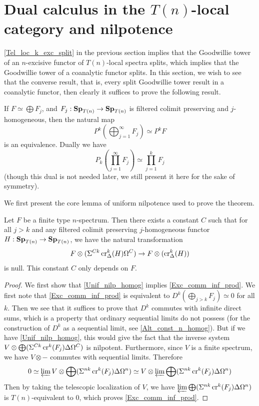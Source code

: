 \section{Dual calculus in the $T(n)$-local category and nilpotence}

	\cref{Tel_loc_k_exc_split} in the previous section implies that the Goodwillie tower of an $n$-excisive functor of $T(n)$-local spectra splits, which implies that the Goodwillie tower of a coanalytic functor splits. In this section, we wish to see that the converse result, that is, every split Goodwillie tower result in a coanalytic functor, then clearly it suffices to prove the following result. 

	\begin{thm}[Mathew]\label{Exc_comm_inf_prod}
		If $F\simeq\bigoplus F_j$, and $F_j:\mathbf{Sp}_{T(n)}\to\mathbf{Sp}_{T(n)}$ is filtered colimit preserving and $j$-homogeneous, then the natural map 
		\[ P^k(\bigoplus_{j=1}^\infty F_j)\simeq P^kF \]
		is an equivalence. 
		Dually we have 
		\[ P_k(\prod_{j=1}^\infty F_j)\simeq\prod_{j=1}^kF_j \]
		(though this dual is not needed later, we still present it here for the sake of symmetry). 
	\end{thm}

	We first present the core lemma of uniform nilpotence used to prove the theorem. 
	\begin{lemma}\label{Unif_nilp_homog}
		Let $F$ be a finite type $n$-spectrum. Then there exists a constant $C$ such that for all $j>k$ and any filtered colimit preserving $j$-homogeneous functor $H:\mathbf{Sp}_{T(n)}\to\mathbf{Sp}_{T(n)}$, we have the natural transformation 
		\[ F\otimes(\Sigma^{Ck}\operatorname{\mathrm{cr}}^k_\Delta(H)\Omega^C)\to F\otimes(\operatorname{\mathrm{cr}}^k_\Delta(H)) \]
		is null. This constant $C$ only depends on $F$. 
	\end{lemma}

	\begin{proof}
		We first show that \cref{Unif_nilp_homog} implies \cref{Exc_comm_inf_prod}. We first note that \cref{Exc_comm_inf_prod} is equivalent to $D^k(\bigoplus_{j>k} F_j)\simeq0$ for all $k$. Then we see that it suffices to prove that $D^k$ commutes with infinite direct sums, which is a property that ordinary sequential limits do not possess (for the construction of $D^k$ as a sequential limit, see \cref{Alt_const_n_homog}). But if we have \cref{Unif_nilp_homog}, this would give the fact that the inverse system $V\otimes\bigoplus(\Sigma^{Ck}\operatorname{\mathrm{cr}}^k(F_j)\Delta\Omega^{C})$ is nilpotent. Furthermore, since $V$ is a finite spectrum, we have $V\otimes-$ commutes with sequential limits. Therefore 
		\[ 0\simeq\varprojlim V\otimes\bigoplus(\Sigma^{nk}\operatorname{\mathrm{cr}}^k(F_j)\Delta\Omega^{n})\simeq V\otimes\varprojlim\bigoplus(\Sigma^{nk}\operatorname{\mathrm{cr}}^k(F_j)\Delta\Omega^{n}) \]
		Then by taking the telescopic localization of $V$, we have $\varprojlim\bigoplus(\Sigma^{nk}\operatorname{\mathrm{cr}}^k(F_j)\Delta\Omega^{n})$ is $T(n)$-equivalent to $0$, which proves \cref{Exc_comm_inf_prod}. 
	\end{proof}

